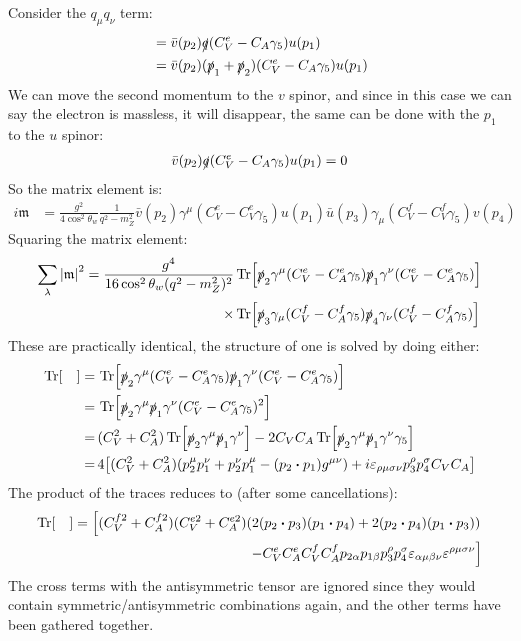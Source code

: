 \documentclass[12pt]{article}
\newcommand{\g}{\gamma}
\renewcommand{\u}[1]{{u(#1)}}
\newcommand{\ub}[1]{{\bar u(#1)}}
\renewcommand{\v}[1]{{v(#1)}}
\renewcommand{\vb}[1]{{\bar v(#1)}}
\newcommand{\sla}[1]{\slashed{#1}}
\newcommand{\munu}{{\mu\nu}}
\newcommand{\veps}{\varepsilon}
\begin{document}
Consider the $q_\mu q_\nu$ term:
\begin{align*}
  &=\vb{p_2}\sla{q}\qty(C_V^e-C_A\g_5)\u{p_1}\\
  &=\vb{p_2}(\sla{p}_1+\sla{p}_2)\qty(C_V^e-C_A\g_5)\u{p_1}
\end{align*}
We can move the second momentum to the $v$ spinor, and since in this case we can say the electron is massless, it will disappear, the same can be done with the $p_1$ to the $u$ spinor:
\begin{align*}
  \vb{p_2}\sla{q}\qty(C_V^e-C_A\g_5)\u{p_1}=0
\end{align*}
So the matrix element is:
\begin{align*}
  i\mathfrak{m}&=\frac{g^2}{4\cos^2\theta_w}\frac{1}{q^2-m_Z^2}
  \vb{p_2}\g^\mu(C_V^e-C_V^e\g_5)
  \u{p_1}\ub{p_3}\g_\mu(C_V^f-C_V^f\g_5)\v{p_4}
\end{align*}
Squaring the matrix element:
\begin{align*}
  \sum_\lambda\abs{\mathfrak{m}}^2=\frac{g^4}{16\cos^2\theta_w(q^2-m_Z^2)^2}
  &\Tr[\sla{p}_2\g^\mu(C_V^e-C_A^e\g_5)\sla{p}_1\g^\nu(C_V^e-C_A^e\g_5)]\\
  \times&\Tr[\sla{p}_3\g_\mu(C_V^f-C_A^f\g_5)\sla{p}_4\g_\nu(C_V^f-C_A^f\g_5)]
\end{align*}
These are practically identical, the structure of one is solved by doing either:
\begin{align*}
  \Tr[\quad]
  =&\,\Tr[\sla{p}_2\g^\mu(C_V^e-C_A^e\g_5)\sla{p}_1\g^\nu(C_V^e-C_A^e\g_5)]\\
  =&\,\Tr[\sla{p}_2\g^\mu\sla{p}_1\g^\nu(C_V^e-C_A^e\g_5)^2]\\
  =&\,(C_V^2+C_A^2)\Tr[\sla{p}_2\g^\mu\sla{p}_1\g^\nu]
  -2C_VC_A\Tr[\sla{p}_2\g^\mu\sla{p}_1\g^\nu\g_5]\\
  =&\,4\qty[(C_V^2+C_A^2)\qty(p_2^\mu p_1^\nu+p_2^\nu p_1^\mu
  -(p_2\vdot p_1)g^\munu)+
  i\veps_{\rho\mu\sigma\nu}p_3^\rho p_4^\sigma C_VC_A]\\
\end{align*}
The product of the traces reduces to (after some cancellations):
\begin{align*}
  \Tr[\quad]=\left[(C_V^{f2}+C_A^{f2})(C_V^{e2}+C_A^{e2})
    \qty(2(p_2\vdot p_3)(p_1\vdot p_4)+2(p_2\vdot p_4)(p_1\vdot p_3))\right.\\
  \left.-C_V^eC_A^eC_V^fC_A^fp_{2\alpha}p_{1\beta}p_3^{\rho}p_4^\sigma
    \veps_{\alpha\mu\beta\nu}\veps^{\rho\mu\sigma\nu}\right]
\end{align*}
The cross terms with the antisymmetric tensor are ignored since they would contain symmetric/antisymmetric combinations again, and the other terms have been gathered together.
\end{document}
